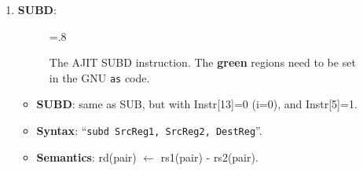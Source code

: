 \begin{enumerate}
\item \textbf{SUBD}:\\
  \begin{center}
    \begin{figure}[h]
      \centering
      \epsfxsize=.8\linewidth
      \caption{The   AJIT   SUBD   instruction.    The   {\darkgreen
          {\textbf{green}}}  regions  need  to   be  set  in  the  GNU
        \texttt{as} code.}
      \label{fig:ajit:subd:insn}
    \end{figure}
  \end{center}
  \begin{itemize}
  \item []\textbf{SUBD}: same as SUB, but with Instr[13]=0 (i=0), and
    Instr[5]=1.
  \item []\textbf{Syntax}: ``\texttt{subd  SrcReg1, SrcReg2, DestReg}''.
  \item []\textbf{Semantics}: rd(pair) $\leftarrow$ rs1(pair) - rs2(pair).
  \end{itemize}


\end{enumerate}
